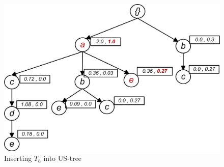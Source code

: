\begin{figure}
  \centering
	\includegraphics[width=.3\textwidth]{images/sim_06.jpg}  
	\caption{Inserting $T_6$ into US-tree}
	\label{figure:t6}
\end{figure}

%